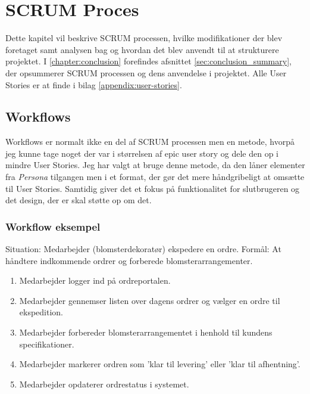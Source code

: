 \chapter{SCRUM Proces}
\label{chapter:scrum}
Dette kapitel vil beskrive SCRUM processen, hvilke modifikationer der blev foretaget samt analysen bag og hvordan det blev anvendt til at strukturere projektet. 
I \ref{chapter:conclusion} forefindes afsnittet \ref{sec:conclusion_summary}, der opsummerer SCRUM processen og dens anvendelse i projektet.
Alle User Stories er at finde i bilag \ref{appendix:user-stories}.

\section{Workflows}
Workflows er normalt ikke en del af SCRUM processen men en metode, hvorpå jeg kunne tage noget der var i størrelsen af epic user story og dele den op i mindre User Stories. 
Jeg har valgt at bruge denne metode, da den låner elementer fra \emph{Persona} tilgangen men i et format, der gør det mere håndgribeligt at omsætte til User Stories.
Samtidig giver det et fokus på funktionalitet for slutbrugeren og det design, der er skal støtte op om det.

\subsection{Workflow eksempel}
Situation: Medarbejder (blomsterdekoratør) ekspedere en ordre.
Formål: At håndtere indkommende ordrer og forberede blomsterarrangementer.
\begin{enumerate}
    \item Medarbejder logger ind på ordreportalen.
    \item Medarbejder gennemser listen over dagens ordrer og vælger en ordre til ekspedition.
    \item Medarbejder forbereder blomsterarrangementet i henhold til kundens specifikationer.
    \item Medarbejder markerer ordren som 'klar til levering' eller 'klar til afhentning'.
    \item Medarbejder opdaterer ordrestatus i systemet.
    \label{item:workflow-eksempel}
\end{enumerate}

